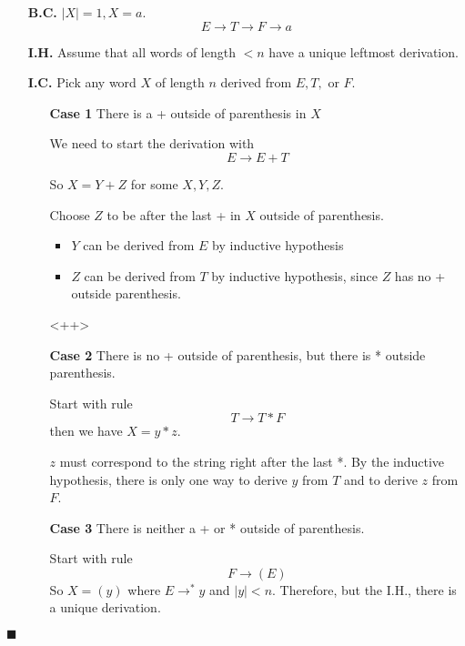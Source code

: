 \documentclass[12pt]{article}
\begin{document}
\begin{enumerate}
	\item[\textbf{B.C.}] $|X|=1, X=a$.
		\[ E \to T \to F \to a \]

	\item[\textbf{I.H.}] Assume that all words of length $<n$
		have a unique leftmost derivation.

	\item[\textbf{I.C.}] Pick any word $X$ of length $n$ derived from
		$E,T,\text{ or }F$.

		\begin{enumerate}
			\item[\textbf{Case 1}] There is a + outside of parenthesis in $X$

				We need to start the derivation with
				\[ E \to E + T \]

				So $X = Y + Z$ for some $X,Y,Z$.

				Choose $Z$ to be after the last + in $X$ outside of parenthesis.
				\begin{itemize}
					\item $Y$ can be derived from $E$ by inductive hypothesis
					\item $Z$ can be derived from $T$ by inductive hypothesis,
						since $Z$ has no + outside parenthesis.
				\end{itemize}<++>
			\item[\textbf{Case 2}] There is no + outside of parenthesis, but
				there is * outside parenthesis.

				Start with rule
				\[ T \to T * F \]
				then we have $X = y * z$.

				$z$ must correspond to the string right after the last *. By the
				inductive hypothesis, there is only one way to derive $y$ from
				$T$ and to derive $z$ from $F$.

			\item[\textbf{Case 3}] There is neither a + or * outside of
				parenthesis.

				Start with rule
				\[F \to (E)\]
				So $X = (y)$ where $E \to^* y$ and $|y|<n$. Therefore, but the
				I.H., there is a unique derivation.
		\end{enumerate}
\end{enumerate}
\hfill $\blacksquare$
\end{document}
